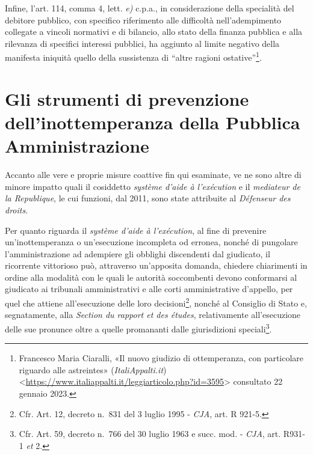 \documentclass[12pt,it,a4paper,]{report}
\begin{document}
Infine, l'art. 114, comma 4, lett. \emph{e)} c.p.a., in considerazione
della specialità del debitore pubblico, con specifico riferimento alle
difficoltà nell'adempimento collegate a vincoli normativi e di bilancio,
allo stato della finanza pubblica e alla rilevanza di specifici
interessi pubblici, ha aggiunto al limite negativo della manifesta
iniquità quello della sussistenza di ``altre ragioni
ostative''\footnote{{Francesco Maria Ciaralli, {«Il nuovo giudizio di
  ottemperanza, con particolare riguardo alle astreintes»}
  (\emph{ItaliAppalti.it})
  \textless{}\url{https://www.italiappalti.it/leggiarticolo.php?id=3595}\textgreater{}
  consultato 22 gennaio 2023.}}.

\hypertarget{gli-strumenti-di-prevenzione-dellinottemperanza-della-pubblica-amministrazione}{%
\section{Gli strumenti di prevenzione dell'inottemperanza della Pubblica
Amministrazione}\label{gli-strumenti-di-prevenzione-dellinottemperanza-della-pubblica-amministrazione}}

Accanto alle vere e proprie misure coattive fin qui esaminate, ve ne
sono altre di minore impatto quali il cosiddetto \emph{système d'aide à
l'exécution} e il \emph{mediateur de la Republique}, le cui funzioni,
dal 2011, sono state attribuite al \emph{Défenseur des droits}.

Per quanto riguarda il \emph{système d'aide à l'exécution}, al fine di
prevenire un'inottemperanza o un'esecuzione incompleta od erronea,
nonché di pungolare l'amministrazione ad adempiere gli obblighi
discendenti dal giudicato, il ricorrente vittorioso può, attraverso
un'apposita domanda, chiedere chiarimenti in ordine alla modalità con le
quali le autorità soccombenti devono conformarsi al giudicato ai
tribunali amministrativi e alle corti amministrative d'appello, per quel
che attiene all'esecuzione delle loro decisioni\footnote{Cfr. Art. 12,
  decreto n.~831 del 3 luglio 1995 - \emph{CJA}, art. R 921-5.}, nonché
al Consiglio di Stato e, segnatamente, alla \emph{Section du rapport et
des études}, relativamente all'esecuzione delle sue pronunce oltre a
quelle promananti dalle giurisdizioni speciali\footnote{Cfr. Art. 59,
  decreto n.~766 del 30 luglio 1963 e succ. mod. - \emph{CJA}, art.
  R931-1 \emph{et} 2.}.
\end{document}
